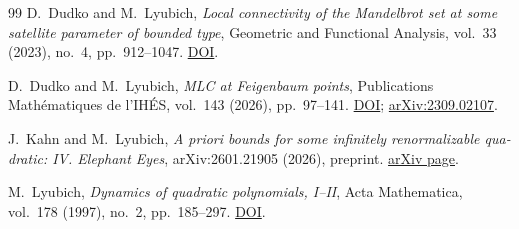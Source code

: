 \documentclass[11pt,a4paper]{report}
\begin{document}
\begin{thebibliography}{99}
D.~Dudko and M.~Lyubich,
\foreignlanguage{english}{\emph{Local connectivity of the Mandelbrot
set at some satellite parameter of bounded type}},
\foreignlanguage{english}{Geometric and Functional Analysis},
vol.~33 (2023), no.~4, pp.~912--1047.
\href{https://doi.org/10.1007/s00039-023-00637-8}{DOI}.

D.~Dudko and M.~Lyubich,
\foreignlanguage{english}{\emph{MLC at Feigenbaum points}},
\foreignlanguage{english}{Publications Mathématiques de l'IHÉS},
vol.~143 (2026), pp.~97--141.
\href{https://doi.org/10.5802/pmihes.2}{DOI};
\href{https://arxiv.org/abs/2309.02107}{arXiv:2309.02107}.

J.~Kahn and M.~Lyubich,
\foreignlanguage{english}{\emph{A priori bounds for some infinitely
renormalizable quadratic: IV. Elephant Eyes}},
arXiv:2601.21905 (2026), preprint.
\href{https://arxiv.org/abs/2601.21905}{arXiv page}.

M.~Lyubich,
\foreignlanguage{english}{\emph{Dynamics of quadratic polynomials,
I--II}},
\foreignlanguage{english}{Acta Mathematica}, vol.~178 (1997), no.~2,
pp.~185--297.
\href{https://doi.org/10.1007/BF02392694}{DOI}.
\end{thebibliography}
\end{document}
